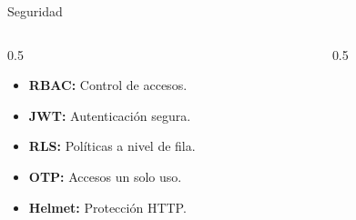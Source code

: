 \documentclass[aspectratio=169]{beamer}
\begin{document}
\begin{frame}{Seguridad}
    \begin{columns}[T]
        \begin{column}{0.5\textwidth}
            \vspace{1cm}
            \begin{itemize}
                \item \textbf{RBAC:} Control de accesos.
                \item \textbf{JWT:} Autenticación segura.
                \item \textbf{RLS:} Políticas a nivel de fila.
                \item \textbf{OTP:} Accesos un solo uso.
                \item \textbf{Helmet:} Protección HTTP.
            \end{itemize}
        \end{column}
        \begin{column}{0.5\textwidth}
            \centering
        \end{column}
    \end{columns}
\end{frame}
\end{document}

